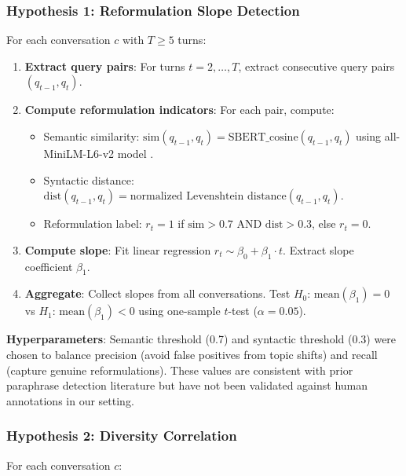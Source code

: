 \subsubsection{Hypothesis 1: Reformulation Slope Detection}

For each conversation $c$ with $T \geq 5$ turns:

\begin{enumerate}
\item \textbf{Extract query pairs}: For turns $t = 2, \ldots, T$, extract consecutive query pairs $(q_{t-1}, q_t)$.

\item \textbf{Compute reformulation indicators}: For each pair, compute:
   \begin{itemize}
   \item Semantic similarity: $\text{sim}(q_{t-1}, q_t) = \text{SBERT\_cosine}(q_{t-1}, q_t)$ using all-MiniLM-L6-v2 model \cite{reimers2019sentence}.
   \item Syntactic distance: $\text{dist}(q_{t-1}, q_t) = \text{normalized Levenshtein distance}(q_{t-1}, q_t)$.
   \item Reformulation label: $r_t = 1$ if $\text{sim} > 0.7$ AND $\text{dist} > 0.3$, else $r_t = 0$.
   \end{itemize}

\item \textbf{Compute slope}: Fit linear regression $r_t \sim \beta_0 + \beta_1 \cdot t$. Extract slope coefficient $\beta_1$.

\item \textbf{Aggregate}: Collect slopes from all conversations. Test $H_0$: $\text{mean}(\beta_1) = 0$ vs $H_1$: $\text{mean}(\beta_1) < 0$ using one-sample $t$-test ($\alpha = 0.05$).
\end{enumerate}

\textbf{Hyperparameters}: Semantic threshold (0.7) and syntactic threshold (0.3) were chosen to balance precision (avoid false positives from topic shifts) and recall (capture genuine reformulations). These values are consistent with prior paraphrase detection literature \cite{zhang2019paws} but have not been validated against human annotations in our setting.

\subsubsection{Hypothesis 2: Diversity Correlation}

For each conversation $c$:

